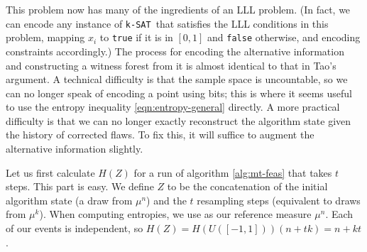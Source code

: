\documentclass[twocolumn]{article}
\newcommand{\ksat}{\texttt{k-SAT}~}
\begin{document}
This problem now has many of the ingredients of an LLL problem.  (In fact, we can encode any instance of \ksat that satisfies the LLL conditions in this problem, mapping $x_i$ to \texttt{true} if it is in $[0,1]$ and \texttt{false} otherwise, and encoding constraints accordingly.)  The process for encoding the alternative information and constructing a witness forest from it is almost identical to that in Tao's argument.  A technical difficulty is that the sample space is uncountable, so we can no longer speak of encoding a point using bits; this is where it seems useful to use the entropy inequality \ref{eqn:entropy-general} directly.  A more practical difficulty is that we can no longer exactly reconstruct the algorithm state given the history of corrected flaws.  To fix this, it will suffice to augment the alternative information slightly.

Let us first calculate $H(Z)$ for a run of algorithm \ref{alg:mt-feas} that takes $t$ steps.  This part is easy.  We define $Z$ to be the concatenation of the initial algorithm state (a draw from $\mu^n$) and the $t$ resampling steps (equivalent to draws from $\mu^k$).  When computing entropies, we use as our reference measure $\mu^n$.  Each of our events is independent, so $H(Z) = H(U([-1,1])) (n + t k) = n + k t$.
\end{document}
